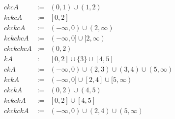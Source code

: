 \begin{enumerate}
\begin{eqnarray*}
        ckcA & := & (0, 1) \cup (1, 2)\\
        kckcA & := & [0, 2]\\
        ckckcA & := & (-\infty, 0) \cup (2, \infty)\\
        kckckcA & := & (-\infty, 0] \cup [2, \infty)\\
        ckckckcA & := & (0, 2)\\
        kA & := & [0, 2] \cup \{3\} \cup [4, 5]\\
        ckA & := & (-\infty, 0) \cup (2, 3) \cup (3, 4) \cup (5, \infty)\\
        kckA & := & (-\infty, 0] \cup [2, 4] \cup [5, \infty)\\
        ckckA & := & (0, 2) \cup (4, 5)\\
        kckckA & := & [0, 2] \cup [4, 5]\\
        ckckckA & := & (-\infty, 0) \cup (2, 4) \cup (5, \infty)\\
    \end{eqnarray*}
\end{enumerate}  
